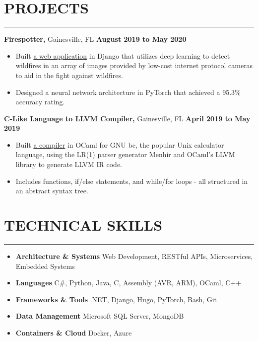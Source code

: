\documentclass[11pt]{article}
\newcommand*{\sectionheaderspace}{\vspace{.40cm}}
\newcommand*{\subsectionspace}{\vspace{.20cm}}
\begin{document}
	\section*{PROJECTS}

	\hrule \relax
	\sectionheaderspace

	\noindent\textbf{Firespotter,} Gainesville, FL  \hfill\textbf{August 2019 to May 2020}
	\begin{itemize}[noitemsep,nolistsep, label={-}]
		\item Built \href{https://github.com/UF-CEN4914/firespotter}{a web application} in Django that utilizes deep learning to detect wildfires in an array of images provided by low-cost internet protocol cameras to aid in the fight against wildfires.
		\item Designed a neural network architecture in PyTorch that achieved a 95.3\% accuracy rating.
	\end{itemize}
	\subsectionspace

	\noindent\textbf{C-Like Language to LLVM Compiler,} Gainesville, FL  \hfill\textbf{April 2019 to May 2019}
	\begin{itemize}[noitemsep,nolistsep, label={-}]
		\item Built \href{https://github.com/hodsonus/programming-language-concepts}{a compiler} in OCaml for GNU bc, the popular Unix calculator language, using the LR(1) parser generator Menhir and OCaml's LLVM library to generate LLVM IR code.
		\item Includes functions, if/else statements, and while/for loops - all structured in an abstract syntax tree.
	\end{itemize}
	\subsectionspace

	\section*{TECHNICAL SKILLS}

	\hrule \relax
	\sectionheaderspace

	\begin{itemize}[noitemsep,nolistsep, label={}]
		\item \textbf{Architecture \& Systems} \tabto*{5cm} Web Development,  RESTful APIs,  Microservices, Embedded Systems
		\item \textbf{Languages} \tabto*{5cm} C\#, Python, Java, C, Assembly (AVR, ARM), OCaml, C++
		\item \textbf{Frameworks \& Tools} \tabto*{5cm} .NET, Django, Hugo, PyTorch, Bash, Git
		\item \textbf{Data Management} \tabto*{5cm} Microsoft SQL Server, MongoDB
		\item \textbf{Containers \& Cloud} \tabto*{5cm}  Docker, Azure
	\end{itemize}
	\subsectionspace

	\rfoot{\today}
\end{document}
